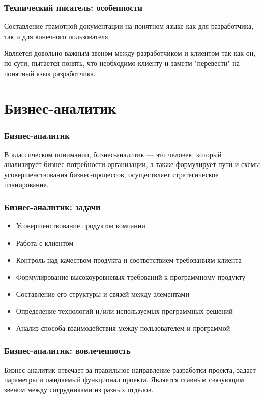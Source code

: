 \documentclass{../industrial-development}
\begin{document}
	\begin{frame} \frametitle{Технический писатель: особенности}
		Составление грамотной документации на понятном языке как для разработчика, так и для конечного пользователя.
	\end{frame}
	
	\lecturenotes
		Является довольно важным звеном между разработчиком и клиентом так как он, по сути, пытается понять, что необходимо клиенту и заметм "перевести" на понятный язык разработчика.
		
	\section{Бизнес-аналитик}
	
	\begin{frame} \frametitle{Бизнес-аналитик}
		\begin{block}{}
			\alert {}В классическом понимании, {бизнес-аналитик} — это человек, который анализирует бизнес-потребности организации, а также формулирует пути и схемы усовершенствования бизнес-процессов, осуществляет стратегическое планирование. 
		\end{block}
		
	\end{frame}
	
	\begin{frame} \frametitle{Бизнес-аналитик: задачи}
		\begin{itemize}
			\item Усовершенствование продуктов компании
			\item Работа с клиентом
			\item Контроль над качеством продукта и соответствием требованиям клиента
			\item Формулирование высокоуровневых требований к программному продукту
			\item Составление его структуры и связей между элементами
			\item Определение технологий и/или используемых программных решений
			\item Анализ способа взаимодействия между пользователем и программой
		\end{itemize}
	\end{frame}
	
	\begin{frame} \frametitle{Бизнес-аналитик: вовлеченность}
		Бизнес-аналитик отвечает за правильное направление разработки проекта, задает параметры и ожидаемый функционал проекта. Является главным связующим звеном между сотрудниками из разных отделов.
	\end{frame}
	
\end{document}
